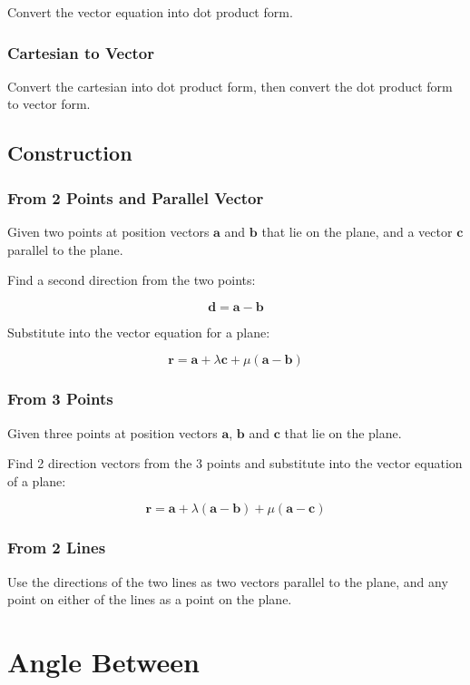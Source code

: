 \documentclass[a4paper,11pt]{article}
\newcommand{\bb}{\boldsymbol}
\begin{document}
Convert the vector equation into dot product form.


\subsubsection{Cartesian to Vector}

Convert the cartesian into dot product form, then convert the dot product form
to vector form.


\subsection{Construction}

\subsubsection{From 2 Points and Parallel Vector}

Given two points at position vectors $\bb{a}$ and $\bb{b}$ that lie on the
plane, and a vector $\bb{c}$ parallel to the plane.

Find a second direction from the two points:

$$
\bb{d} = \bb{a} - \bb{b}
$$

Substitute into the vector equation for a plane:

$$
\bb{r} = \bb{a} + \lambda \bb{c} + \mu (\bb{a} - \bb{b})
$$


\subsubsection{From 3 Points}

Given three points at position vectors $\bb{a}$, $\bb{b}$ and $\bb{c}$ that lie
on the plane.

Find 2 direction vectors from the 3 points and substitute into the vector
equation of a plane:

$$
\bb{r} = \bb{a} + \lambda (\bb{a} - \bb{b}) + \mu (\bb{a} - \bb{c})
$$


\subsubsection{From 2 Lines}

Use the directions of the two lines as two vectors parallel to the plane, and
any point on either of the lines as a point on the plane.



\section{Angle Between}
\end{document}
